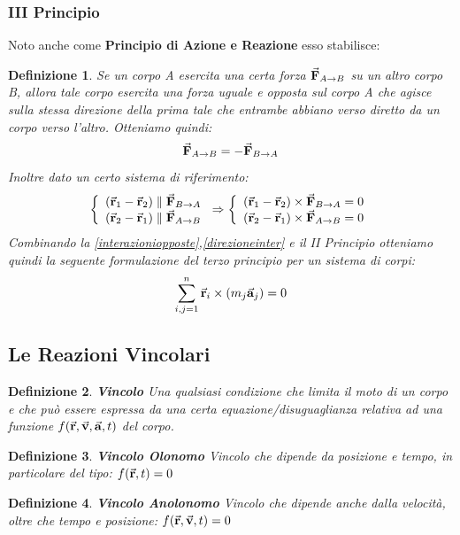 \documentclass{article}
\newtheorem{defn}{Definizione}[section]
\newcommand{\then}{\ensuremath{\Rightarrow}}
\renewcommand{\a}{\va{a}}
\renewcommand{\v}{\va{v}}
\renewcommand{\r}{\va{r}}
\newcommand{\F}{\va{F}}
\begin{document}
\subsubsection{III Principio}
Noto anche come \textbf{Principio di Azione e Reazione} esso stabilisce:
\begin{defn}
Se un corpo A esercita una certa forza $\F_{A\to B}$ su un altro corpo B, allora tale corpo esercita una forza uguale e opposta sul corpo A che agisce sulla stessa direzione della prima tale che entrambe abbiano verso diretto da un corpo verso l'altro. Otteniamo quindi:
\begin{equation}
\label{interazioniopposte}
\F_{A\to B}=-\F_{B\to A}
\end{equation}
Inoltre dato un certo sistema di riferimento:
\begin{equation}
\label{direzioneinter}
\left\{\begin{array}{l}
    (\r_1-\r_2)\parallel \F_{B\to A}  \\
    (\r_2-\r_1)\parallel \F_{A\to B}  \\ 
\end{array}\right.\then
\left\{\begin{array}{l}
    (\r_1-\r_2)\times\F_{B\to A}=0  \\
    (\r_2-\r_1)\times\F_{A\to B}=0  \\ 
\end{array}\right.
\end{equation}
Combinando la \ref{interazioniopposte},\ref{direzioneinter} e il II Principio otteniamo quindi la seguente formulazione del terzo principio per un sistema di corpi:
\begin{equation}
    \sum_{i,j=1}^n \r_i\times(m_j\a_j)=0
\end{equation}
\end{defn}

\subsection{Le Reazioni Vincolari}

\begin{defn}
\textbf{Vincolo} Una qualsiasi condizione che limita il moto di un corpo e che può essere espressa da una certa equazione/disuguaglianza relativa ad una funzione $f(\r,\v,\a,t)$ del corpo.
\end{defn}

\begin{defn}
\textbf{Vincolo Olonomo} Vincolo che dipende da posizione e tempo, in particolare del tipo: \(f(\r,t)=0\)
\end{defn}
\begin{defn}
\textbf{Vincolo Anolonomo} Vincolo che dipende anche dalla velocità, oltre che tempo e posizione: \(f(\r,\v,t)=0\)
\end{defn}
\end{document}
